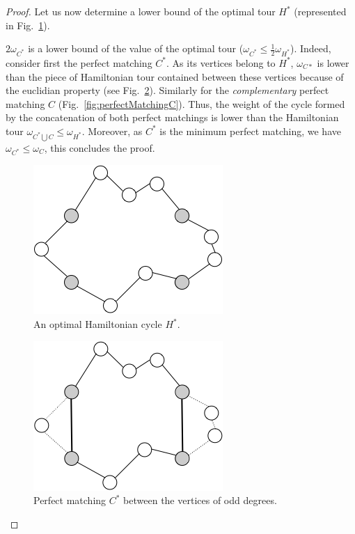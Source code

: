 \begin{proof}
Let us now determine a lower bound of the optimal tour $H^*$ (represented in Fig.~\ref{fig:perfectMatchingInitial}).

$2 \omega_{C^*}$ is a lower bound of the value of the optimal tour ($\omega_{C^*} \leq \frac{1}{2} \omega_{H^*}$). 
Indeed, consider first the perfect matching $C^*$.
As its vertices belong to $H^*$, $\omega_{C*}$ is lower than the piece of Hamiltonian tour contained between these vertices
because of the euclidian property (see Fig.~\ref{fig:perfectMatchingC*}).
Similarly for the \textit{complementary} perfect matching $C$ (Fig.~\ref{fig:perfectMatchingC}).  
Thus, the weight of the cycle formed by the concatenation of both perfect matchings is lower than the Hamiltonian tour $\omega_{C^* \bigcup C} \leq \omega_{H^*}$.
Moreover, as $C^*$ is the minimum perfect matching, we have $\omega_{C^*} \leq \omega_{C}$, this concludes the proof.


\begin{figure}[hbt]
\begin{center}
       \includegraphics[scale=0.7]{FiguresGraph/perfectmatching1}
       \caption{An optimal Hamiltonian cycle $H^*$.}
              \label{fig:perfectMatchingInitial}
\end{center}
\end{figure}

\begin{figure}[hbt]
\begin{center}
       \includegraphics[scale=0.7]{FiguresGraph/perfectmatching2}
       \caption{Perfect matching $C^*$ between the vertices of odd degrees.}
              \label{fig:perfectMatchingC*}
\end{center}
\end{figure}


\end{proof}
